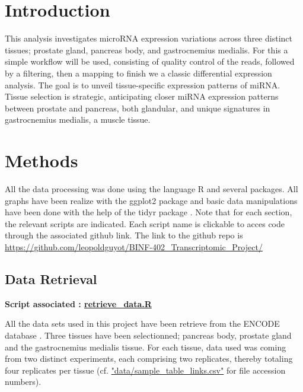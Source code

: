 \documentclass[a4paper, 11pt]{article}
\begin{document}
\begin{multicols}{2}
\section{Introduction}
This analysis investigates microRNA expression variations across three distinct tissues; prostate gland, pancreas body, and gastrocnemius medialis. For this a simple workflow will be used, consisting of quality control of the reads, followed by a filtering, then a mapping to finish we a classic differential expression analysis. The goal is to unveil tissue-specific expression patterns of miRNA. Tissue selection is strategic, anticipating closer miRNA expression patterns between prostate and pancreas, both glandular, and unique signatures in gastrocnemius medialis, a muscle tissue.

\section{Methods}
All the data processing was done using the language R \citep{Rlang} and several packages. All graphs have been realize with the ggplot2 package \citep{ggplot2} and basic data manipulations have been done with the help of the tidyr package \citep{tidyr}. Note that for each section, the relevant scripts are indicated. Each script name is clickable to acces code through the associated github link. The link to the github repo is
{\scriptsize \href{https://github.com/leopoldguyot/BINF-402_Transcriptomic_Project/}{https://github.com/leopoldguyot/BINF-402\_Transcriptomic\_Project/}}
\subsection{Data Retrieval}
\begin{scriptsize}
	\textbf{Script associated : \href{https://github.com/leopoldguyot/BINF-402_Transcriptomic_Project/blob/main/retrieve_data.R}{retrieve\_data.R}}
\end{scriptsize}



All the data sets used in this project have been retrieve from the ENCODE database \citep{luo2020new}.
Three tissues have been selectionned; pancreas body, prostate gland and the gastrocnemius medialis tissue.
For each tissue, data used was coming from two distinct experiments, each comprising two replicates, thereby totaling four replicates per tissue (cf. \href{https://github.com/leopoldguyot/BINF-402_Transcriptomic_Project/blob/data/sample_table_links.csv}{"data/sample\_table\_links.csv"} for file accession numbers).


\end{multicols}
\end{document}
